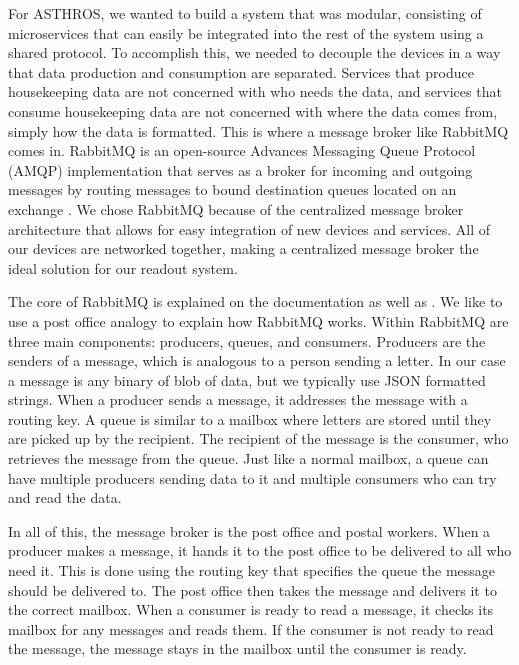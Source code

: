 For ASTHROS, we wanted to build a system that was modular, consisting of microservices that can easily be integrated into the rest of the system using a shared protocol.
To accomplish this, we needed to decouple the devices in a way that data production and consumption are separated.
Services that produce housekeeping data are not concerned with who needs the data, and services that consume housekeeping data are not concerned with where the data comes from, simply how the data is formatted. 
This is where a message broker like RabbitMQ comes in.
RabbitMQ is an open-source Advances Messaging Queue Protocol (AMQP) implementation that serves as a broker for incoming and outgoing messages by routing messages to bound destination queues located on an exchange \parencite{dunne2018comparison}.
We chose RabbitMQ because of the centralized message broker architecture that allows for easy integration of new devices and services.
All of our devices are networked together, making a centralized message broker the ideal solution for our readout system.

The core of RabbitMQ is explained on the documentation as well as \cite{toshev2015learning}.
We like to use a post office analogy to explain how RabbitMQ works.
Within RabbitMQ are three main components: producers, queues, and consumers. 
Producers are the senders of a message, which is analogous to a person sending a letter.
In our case a message is any binary of blob of data, but we typically use JSON formatted strings.
When a producer sends a message, it addresses the message with a routing key.
A queue is similar to a mailbox where letters are stored until they are picked up by the recipient.
The recipient of the message is the consumer, who retrieves the message from the queue.
Just like a normal mailbox, a queue can have multiple producers sending data to it and multiple consumers who can try and read the data.

In all of this, the message broker is the post office and postal workers.
When a producer makes a message, it hands it to the post office to be delivered to all who need it.
This is done using the routing key that specifies the queue the message should be delivered to.
The post office then takes the message and delivers it to the correct mailbox. 
When a consumer is ready to read a message, it checks its mailbox for any messages and reads them.
If the consumer is not ready to read the message, the message stays in the mailbox until the consumer is ready.

